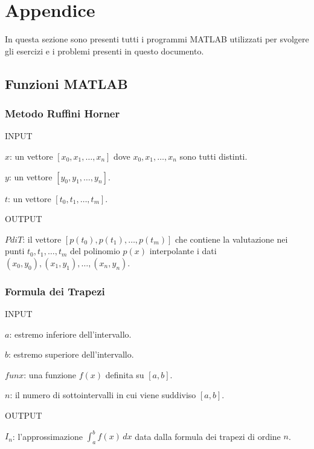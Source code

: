 \documentclass[a4paper,12pt]{article}
\begin{document}
\clearpage

\section{Appendice}
In questa sezione sono presenti tutti i programmi MATLAB utilizzati per svolgere gli esercizi e i problemi presenti in questo documento.
\subsection{Funzioni MATLAB}

\subsubsection{Metodo Ruffini Horner}
INPUT
\begin{description}
\item $x$: un vettore $[x_0,x_1, \dots, x_n]$ dove $x_0,x_1, \dots, x_n$ sono tutti distinti.
\item $y$: un vettore $[y_0,y_1, \dots, y_n]$.
\item $t$: un vettore $[t_0,t_1, \dots, t_m]$.
\end{description}
OUTPUT
\begin{description}
\item $PdiT$: il vettore $[p(t_0),p(t_1), \dots, p(t_m)]$ che contiene la valutazione nei punti $t_0, t_1,\dots,t_m$ del polinomio $p(x)$ interpolante i dati \\$(x_0,y_0),(x_1,y_1),\dots,(x_n,y_n)$.
\end{description}


\subsubsection{Formula dei Trapezi}
INPUT
\begin{description}
\item $a$: estremo inferiore dell'intervallo.
\item $b$: estremo superiore dell'intervallo.
\item $funx$: una funzione $f(x)$ definita su $[a, b]$.
\item $n$: il numero di sottointervalli in cui viene suddiviso $[a, b]$.
\end{description}
OUTPUT
\begin{description}
\item $I_n$: l'approssimazione $\int_{a}^{b}f(x)\,dx$ data dalla formula dei trapezi di ordine $n$.
\end{description}

\end{document}
